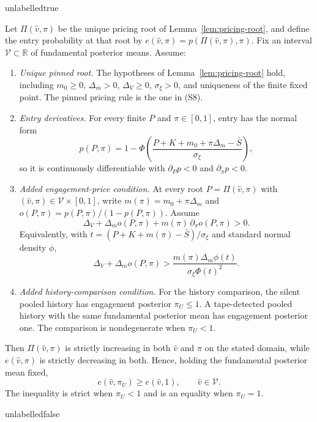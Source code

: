 \csname unlabelledtrue\endcsname
\begin{lemma}
\label{lem:entry-undetected}
Let $\Pi(\widehat v,\pi)$ be the unique pricing root of
Lemma~\ref{lem:pricing-root}, and define the entry probability at that root by
$e(\widehat v,\pi)=p(\Pi(\widehat v,\pi),\pi)$. Fix an interval
$\mathcal V\subset\mathbb R$ of fundamental posterior means. Assume:
\begin{enumerate}[label=(I-\arabic*),leftmargin=3.2em,itemsep=3pt]
\item \emph{Unique pinned root.} The hypotheses of Lemma~\ref{lem:pricing-root} hold, including
  $m_0\ge0$, $\Delta_m>0$, $\Delta_V\ge0$, $\sigma_\xi>0$, and uniqueness of the finite fixed
  point. The pinned pricing rule is the one in (S8).
\item \emph{Entry derivatives.} For every finite $P$ and $\pi\in[0,1]$, entry has the normal form
  \[
    p(P,\pi)=1-\Phi\!\left(
      \frac{P+K+m_0+\pi\Delta_m-\bar S}{\sigma_\xi}\right),
  \]
  so it is continuously differentiable with
  $\partial_Pp<0$ and $\partial_\pi p<0$.
\item \emph{Added engagement-price condition.} At every root
  $P=\Pi(\widehat v,\pi)$ with $(\widehat v,\pi)\in\mathcal V\times[0,1]$, write
  $m(\pi)=m_0+\pi\Delta_m$ and $o(P,\pi)=p(P,\pi)/(1-p(P,\pi))$. Assume
  \begin{equation}
  \label{eq:entry-price-condition}
    \Delta_V+\Delta_m o(P,\pi)+m(\pi)\,\partial_\pi o(P,\pi)>0.
  \end{equation}
  Equivalently, with
  $t=(P+K+m(\pi)-\bar S)/\sigma_\xi$ and standard normal density $\phi$,
  \[
    \Delta_V+\Delta_m o(P,\pi)
    >
    \frac{m(\pi)\Delta_m\phi(t)}{\sigma_\xi\Phi(t)^2}.
  \]
\item \emph{Added history-comparison condition.} For the history comparison, the silent pooled
  history has engagement posterior $\pi_U\le1$. A tape-detected pooled history with the same fundamental
  posterior mean has engagement posterior one. The comparison is nondegenerate when $\pi_U<1$.
\end{enumerate}
Then $\Pi(\widehat v,\pi)$ is strictly increasing in both $\widehat v$ and $\pi$ on the stated
domain, while $e(\widehat v,\pi)$ is strictly decreasing in both. Hence, holding the fundamental
posterior mean fixed,
\begin{equation}
\label{eq:entry-undetected-gap}
  e(\widehat v,\pi_U)\ge e(\widehat v,1),
  \qquad \widehat v\in\mathcal V.
\end{equation}
The inequality is strict when $\pi_U<1$ and is an equality when $\pi_U=1$.
\end{lemma}
\csname unlabelledfalse\endcsname

